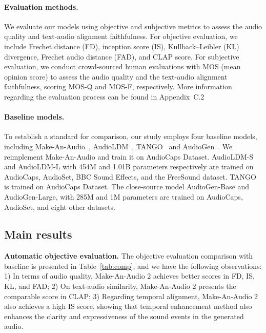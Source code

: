 \documentclass{article}
\begin{document}
\paragraph{Evaluation methods.}  \label{training}
We evaluate our models using objective and subjective metrics to assess the audio quality and text-audio alignment faithfulness. For objective evaluation, we include Frechet distance (FD), inception score (IS), Kullback–Leibler (KL) divergence, Frechet audio distance (FAD), and CLAP score. For subjective evaluation, we conduct crowd-sourced human evaluations with MOS (mean opinion score) to assess the audio quality and the text-audio alignment faithfulness, scoring MOS-Q and MOS-F, respectively. More information regarding the evaluation process can be found in Appendix~C.2 


\paragraph{Baseline models.}
To establish a standard for comparison, our study employs four baseline models, including Make-An-Audio~\cite{huang2023makeanaudio}, AudioLDM~\cite{liuAudioLDMTexttoAudioGeneration2023}, TANGO~\cite{ghosal2023texttoaudio} and AudioGen~\cite{kreukAudioGenTextuallyGuided2023}. We reimplement Make-An-Audio and train it on AudioCaps Dataset. AudioLDM-S and AudioLDM-L with 454M and 1.01B parameters respectively are trained on AudioCaps, AudioSet, BBC Sound Effects, and the FreeSound dataset. TANGO is trained on AudioCaps Dataset.  The close-source model AudioGen-Base and AudioGen-Large, with 285M and 1M parameters are trained on AudioCaps, AudioSet, and eight other datasets.



\subsection{Main results}
\textbf{Automatic objective evaluation.} 
The objective evaluation comparison with baseline is presented in Table~\ref{tab:comp}, and we have the following observations: 1) In terms of audio quality, Make-An-Audio 2 achieves better scores in FD, IS, KL, and FAD; 2) On text-audio similarity, Make-An-Audio 2 presents the comparable score in CLAP; 3) Regarding temporal alignment, Make-An-Audio 2 also achieves a high IS score, showing that temporal enhancement method also enhances the clarity and expressiveness of the sound events in the generated audio. 
\end{document}
